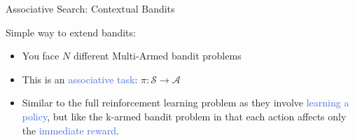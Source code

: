 \documentclass{beamer}
\begin{document}
\begin{frame}{Associative Search: Contextual Bandits}

Simple way to extend bandits:

\vspace{2mm}

\begin{itemize}
    \item You face $N$ different Multi-Armed bandit problems%
    \item This is an \textcolor{RoyalBlue}{associative task}: $\pi: \mathcal{S}\rightarrow \mathcal{A}$
    \item Similar to the full reinforcement learning problem as they involve \textcolor{RoyalBlue}{learning a policy}, but like the k-armed bandit problem in that each action affects only the \textcolor{RoyalBlue}{immediate reward}.
\end{itemize}

\end{frame}




\end{document}
